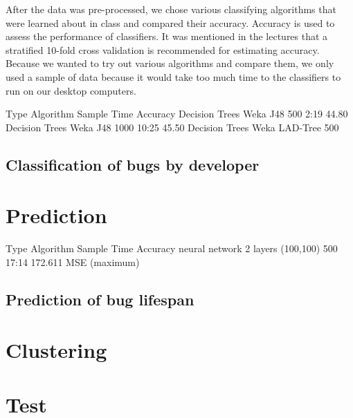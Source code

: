 After the data was pre-processed, we chose various classifying algorithms that were learned about in class and compared their accuracy. Accuracy is used to assess the performance of classifiers. It was mentioned in the lectures that a stratified 10-fold cross validation is recommended for estimating accuracy. Because we wanted to try out various algorithms and compare them, we only used a sample of data because it would take too much time to the classifiers to run on our desktop computers.

Type             Algorithm     Sample    Time    Accuracy
Decision Trees   Weka J48       500      2:19      44.80%
Decision Trees   Weka J48      1000     10:25      45.50%
Decision Trees   Weka LAD-Tree  500       


\subsection{Classification of bugs by developer} %
\label{sub:Classification of bugs bugs by developer}


\section{Prediction} %
\label{sub:Prediction}
Type             Algorithm         Sample    Time    Accuracy
neural network 2 layers (100,100)  500       17:14   172.611 MSE (maximum)

\subsection{Prediction of bug lifespan} %
\label{sub:Prediction of bug lifespan}

\section{Clustering} %
\label{sub:Clustering}

\section{Test} %
\label{sec:Test}

